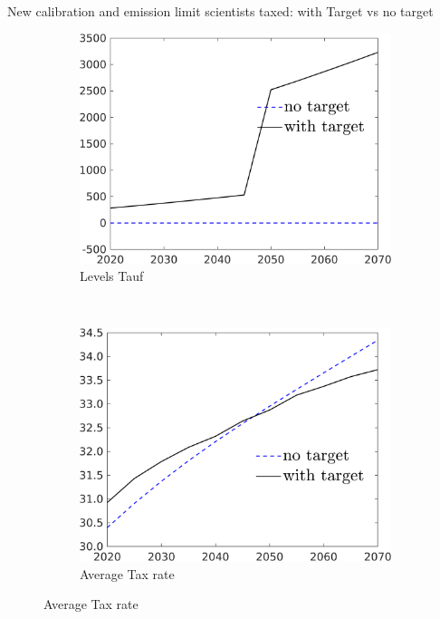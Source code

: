 \documentclass[11pt,aspectratio=169]{beamer}
\begin{document}
\begin{frame}{New calibration and emission limit scientists taxed: with Target vs no target}
	\begin{figure}[h!!]
		\centering
		\begin{subfigure}{0.4\textwidth}		
			\caption{{Levels  Tauf}}
			\includegraphics[width=1\textwidth]{../codding_model/own_basedOnFried/optimalPol_010922_revision/figures/all_13Sept22/NewCalib_pol_TvsNoT_Tauf_emnet1_Sun2_spillover0_knspil3_xgr0_nsk0_sep0_extern0_PV1_etaa0.79_lgd1.png}
		\end{subfigure}
		\begin{minipage}[]{0.1\textwidth}
			\
		\end{minipage}
		\begin{subfigure}{0.4\textwidth}		
			\caption{{Average Tax rate}}
			\includegraphics[width=1\textwidth]{../codding_model/own_basedOnFried/optimalPol_010922_revision/figures/all_13Sept22/NewCalib_pol_TvsNoT_dTaulAvS_emnet1_Sun2_spillover0_knspil3_xgr0_nsk0_sep0_extern0_PV1_etaa0.79_lgd1.png}
		\end{subfigure}
	\end{figure}
\end{frame}
\end{document}
